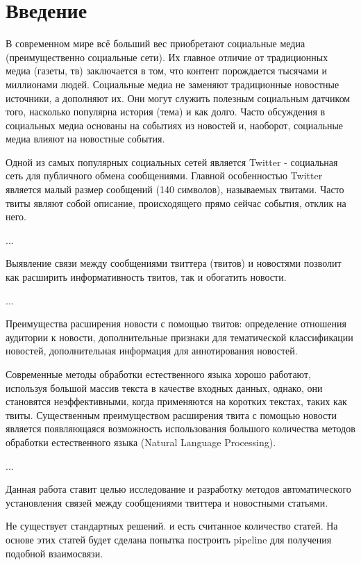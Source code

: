 \documentclass[14pt,a4paper,oneside]{extarticle}
\begin{document}


\tableofcontents

\clearpage

\section*{Введение}
    В современном мире всё больший вес приобретают социальные медиа (преимущественно социальные сети). Их главное отличие от традиционных медиа (газеты, тв) заключается в том, что контент порождается тысячами и миллионами людей. Социальные медиа не заменяют традиционные новостные источники, а дополняют их. Они могут служить полезным социальным датчиком того, насколько популярна история (тема) и как долго. Часто обсуждения в социальных медиа основаны на событиях из новостей и, наоборот, социальные медиа влияют на новостные события.

    Одной из самых популярных социальных сетей является Twitter - социальная сеть для публичного обмена сообщениями. Главной особенностью Twitter является малый размер сообщений (140 символов), называемых твитами. Часто твиты являют собой описание, происходящего прямо сейчас события, отклик на него.

    ...

    Выявление связи между сообщениями твиттера (твитов) и новостями позволит как расширить информативность твитов, так и обогатить новости.

    ...

    Преимущества расширения новости с помощью твитов: определение отношения аудитории к новости, дополнительные признаки для тематической классификации новостей, дополнительная информация для аннотирования новостей.

    Современные методы обработки естественного языка хорошо работают, используя большой массив текста в качестве входных данных, однако, они становятся неэффективными, когда применяются на коротких текстах, таких как твиты. Существенным преимуществом расширения твита с помощью новости является появляющаяся возможность использования большого количества методов обработки естественного языка (Natural Language Processing).

    ...


    Данная работа ставит целью исследование и разработку методов автоматического установления связей между сообщениями твиттера и новостными статьями.

    {\color{red} Не существует стандартных решений. и есть считанное количество статей. На основе этих статей будет сделана попытка построить pipeline для получения подобной взаимосвязи.}
\end{document}
